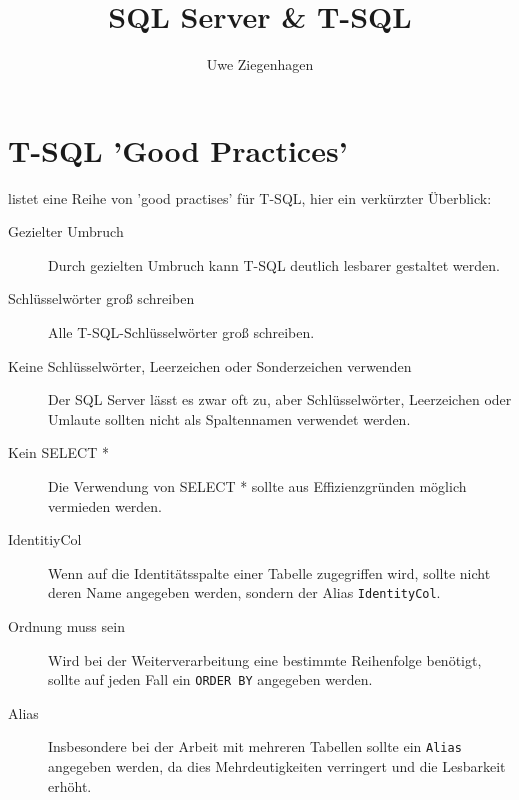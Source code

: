 \documentclass[12pt,ngerman,a4paper,index=totoc,twoside]{scrartcl}
\author{Uwe Ziegenhagen}
\title{SQL Server \& T-SQL}
\newcommand{\sql}[1]{\texttt{#1}}
\begin{document}
\maketitle

\tableofcontents

\listoftables

\clearpage

\section{T-SQL 'Good Practices'}

\cite{knigge} listet eine Reihe von 'good practises' für T-SQL, hier ein verkürzter Überblick:

\begin{description}
	\item[Gezielter Umbruch] 

Durch gezielten Umbruch kann T-SQL deutlich lesbarer gestaltet werden.
	
	\item[Schlüsselwörter groß schreiben] 
	
Alle T-SQL-Schlüsselwörter groß schreiben.	
	
	\item[Keine Schlüsselwörter, Leerzeichen oder Sonderzeichen verwenden] 
	
Der SQL Server lässt es zwar oft zu, aber Schlüsselwörter, Leerzeichen oder Umlaute sollten nicht als Spaltennamen verwendet werden.
	
	\item[Kein SELECT *] 
	
Die Verwendung von SELECT * sollte aus Effizienzgründen möglich vermieden werden.
	
	\item[IdentitiyCol] 
	
Wenn auf die Identitätsspalte einer Tabelle zugegriffen wird, sollte nicht deren Name angegeben werden, sondern der Alias \sql{IdentityCol}. 	
	
	\item[Ordnung muss sein] 
	
Wird bei der Weiterverarbeitung eine bestimmte Reihenfolge benötigt, sollte auf jeden Fall ein \sql{ORDER BY} angegeben werden. 
	
	\item[Alias] 
	
Insbesondere bei der Arbeit mit mehreren Tabellen sollte ein \sql{Alias} angegeben werden, da dies Mehrdeutigkeiten verringert und die Lesbarkeit erhöht.
	

\end{description}
\end{document}
